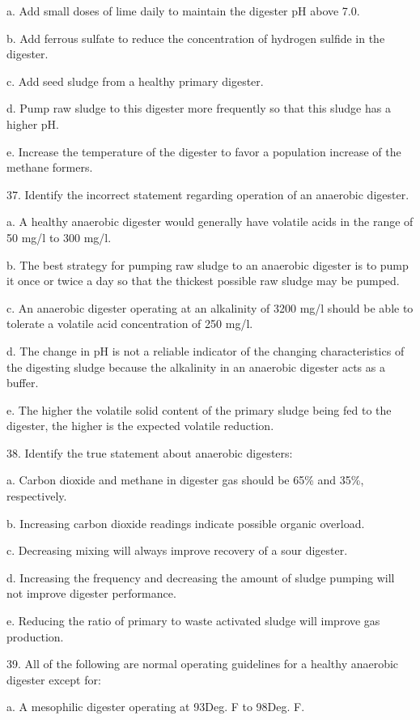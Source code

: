 \documentclass{article}
\begin{document}
a. Add small doses of lime daily to maintain the digester pH above 7.0. 

b. Add ferrous sulfate to reduce the concentration of hydrogen sulfide in the digester. 

c. Add seed sludge from a healthy primary digester. 

d. Pump raw sludge to this digester more frequently so that this sludge has a higher pH. 

e. Increase the temperature of the digester to favor a population increase of the methane formers. 


37. Identify the incorrect statement regarding operation of an anaerobic digester.

a. A healthy anaerobic digester would generally have volatile acids in the range of 50 mg/l to 300 mg/l. 

b. The best strategy for pumping raw sludge to an anaerobic digester is to pump it once or twice a day so that the thickest possible raw sludge may be pumped. 

c. An anaerobic digester operating at an alkalinity of 3200 mg/l should be able to tolerate a volatile acid concentration of 250 mg/l. 

d. The change in pH is not a reliable indicator of the changing characteristics of the digesting sludge because the alkalinity in an anaerobic digester acts as a buffer. 

e. The higher the volatile solid content of the primary sludge being fed to the digester, the higher is the expected volatile reduction. 


38. Identify the true statement about anaerobic digesters:

a. Carbon dioxide and methane in digester gas should be 65\% and 35\%, respectively. 

b. Increasing carbon dioxide readings indicate possible organic overload. 

c. Decreasing mixing will always improve recovery of a sour digester. 

d. Increasing the frequency and decreasing the amount of sludge pumping will not improve digester performance. 

e. Reducing the ratio of primary to waste activated sludge will improve gas production. 


39. All of the following are normal operating guidelines for a healthy anaerobic digester except for:

a. A mesophilic digester operating at 93Deg. F to 98Deg. F. 
\end{document}
